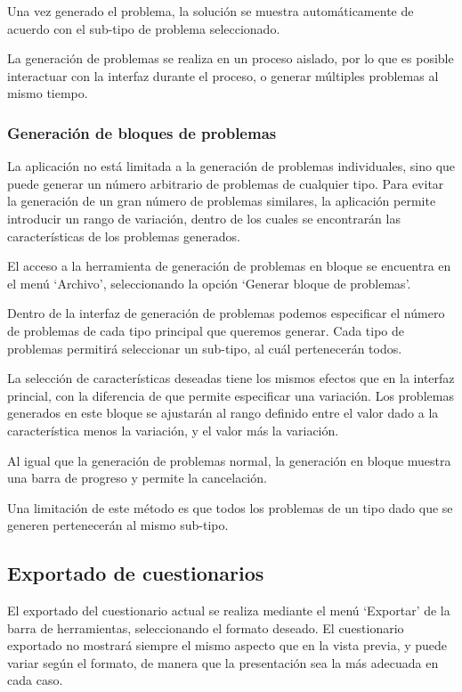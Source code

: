
Una vez generado el problema, la solución se muestra automáticamente de acuerdo con el sub-tipo de problema seleccionado.

La generación de problemas se realiza en un proceso aislado, por lo que es posible interactuar con la interfaz durante el proceso, o generar múltiples problemas al mismo tiempo.

\subsubsection{Generación de bloques de problemas}
La aplicación no está limitada a la generación de problemas individuales, sino que puede generar un número arbitrario de problemas de cualquier tipo.
Para evitar la generación de un gran número de problemas similares, la aplicación permite introducir un rango de variación, dentro de los cuales se encontrarán las características de los problemas generados.

El acceso a la herramienta de generación de problemas en bloque se encuentra en el menú `Archivo', seleccionando la opción `Generar bloque de problemas'.


Dentro de la interfaz de generación de problemas podemos especificar el número de problemas de cada tipo principal que queremos generar.
Cada tipo de problemas permitirá seleccionar un sub-tipo, al cuál pertenecerán todos.

La selección de características deseadas tiene los mismos efectos que en la interfaz princial, con la diferencia de que permite especificar una variación.
Los problemas generados en este bloque se ajustarán al rango definido entre el valor dado a la característica menos la variación, y el valor más la variación.


Al igual que la generación de problemas normal, la generación en bloque muestra una barra de progreso y permite la cancelación.

Una limitación de este método es que todos los problemas de un tipo dado que se generen pertenecerán al mismo sub-tipo.

\subsection{Exportado de cuestionarios}
El exportado del cuestionario actual se realiza mediante el menú `Exportar' de la barra de herramientas, seleccionando el formato deseado.
El cuestionario exportado no mostrará siempre el mismo aspecto que en la vista previa, y puede variar según el formato, de manera que la presentación sea la más adecuada en cada caso.

